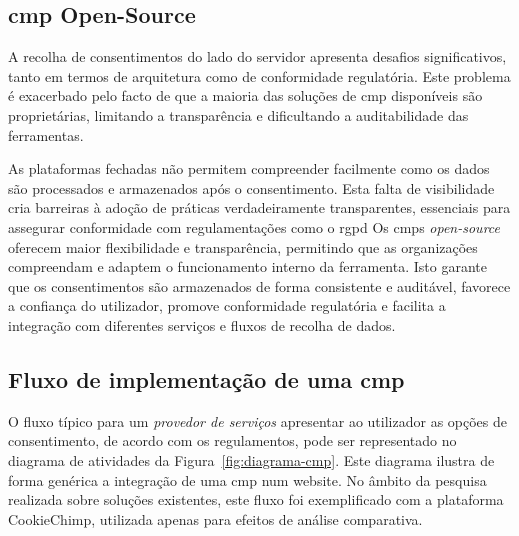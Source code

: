 \subsection{\acrshort{cmp} Open-Source}

A recolha de consentimentos do lado do servidor apresenta desafios significativos, tanto em termos de arquitetura como de conformidade regulatória. Este problema é exacerbado pelo facto de que a maioria das soluções de \acrshort{cmp} disponíveis são proprietárias, limitando a transparência e dificultando a auditabilidade das ferramentas.

As plataformas fechadas não permitem compreender facilmente como os dados são processados e armazenados após o consentimento. Esta falta de visibilidade cria barreiras à adoção de práticas verdadeiramente transparentes, essenciais para assegurar conformidade com regulamentações como o \acrshort{rgpd}
Os \acrshort{cmp}s \textit{open-source} oferecem maior flexibilidade e transparência, permitindo que as organizações compreendam e adaptem o funcionamento interno da ferramenta. Isto garante que os consentimentos são armazenados de forma consistente e auditável, favorece a confiança do utilizador, promove conformidade regulatória e facilita a integração com diferentes serviços e fluxos de recolha de dados.

\subsection{Fluxo de implementação de uma \acrshort{cmp}}

O fluxo típico para um \textit{provedor de serviços} apresentar ao utilizador as opções de consentimento, de acordo com os regulamentos, pode ser representado no diagrama de atividades da Figura~\ref{fig:diagrama-cmp}.
Este diagrama ilustra de forma genérica a integração de uma \acrshort{cmp} num website.
No âmbito da pesquisa realizada sobre soluções existentes, este fluxo foi exemplificado com a plataforma CookieChimp, utilizada apenas para efeitos de análise comparativa.

